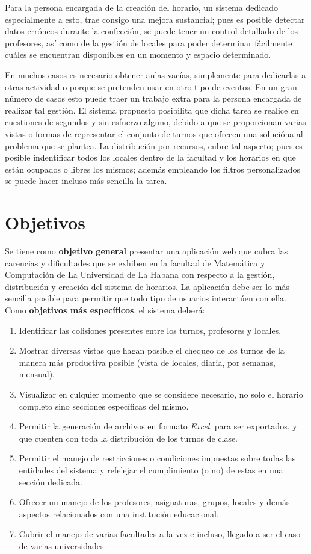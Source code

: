 Para la persona encargada de la creación del horario, un sistema dedicado especialmente a esto, trae consigo una mejora sustancial; pues es posible detectar datos erróneos durante la confección, se puede tener un control detallado de los profesores, así como de la gestión de locales para poder determinar fácilmente cuáles se encuentran disponibles en un momento y espacio determinado.
	
En muchos casos es necesario obtener aulas vacías, simplemente para dedicarlas a otras actividad o porque se pretenden usar en otro tipo de eventos. En un gran número de casos esto puede traer un trabajo extra para la persona encargada de realizar tal gestión. El sistema propuesto posibilita que dicha tarea se realice en cuestiones de segundos y sin esfuerzo alguno, debido a que se proporcionan varias vistas o formas de representar el conjunto de turnos que ofrecen una solucióna al problema que se plantea. La distribución por recursos, cubre tal aspecto; pues es posible indentificar todos los locales dentro de la facultad y los horarios en que están ocupados o libres los mismos; además empleando los filtros personalizados se puede hacer incluso más sencilla la tarea.

	
\section{Objetivos}
Se tiene como \textbf{objetivo general} presentar una aplicación web que cubra las carencias y dificultades que se exhiben en la facultad de Matemática y Computación de La Universidad de La Habana con respecto a la gestión, distribución y creación del sistema de horarios. 
La aplicación debe ser lo más sencilla posible para permitir que todo tipo de usuarios interactúen con ella. Como \textbf{objetivos más específicos}, el sistema deberá:
\begin{enumerate}
	\item Identificar las colisiones presentes entre los turnos, profesores y locales.
	\item Mostrar diversas vistas que hagan posible el chequeo de los turnos de la manera más productiva posible (vista de locales, diaria, por semanas, mensual).
	\item Visualizar en culquier momento que se considere necesario, no solo el horario completo sino secciones específicas del mismo.
	\item Permitir la generación de archivos en formato \textit{Excel}, para ser exportados, y que cuenten con toda la distribución de los turnos de clase.
	\item Permitir el manejo de restricciones o condiciones impuestas sobre todas las entidades del sistema y refelejar el cumplimiento (o no) de estas en una sección dedicada.
	\item Ofrecer un manejo de los profesores, asignaturas, grupos, locales y demás aspectos relacionados con una institución educacional.
	\item Cubrir el manejo de varias facultades a la vez e incluso, llegado a ser el caso de varias universidades. 
\end{enumerate}
	
